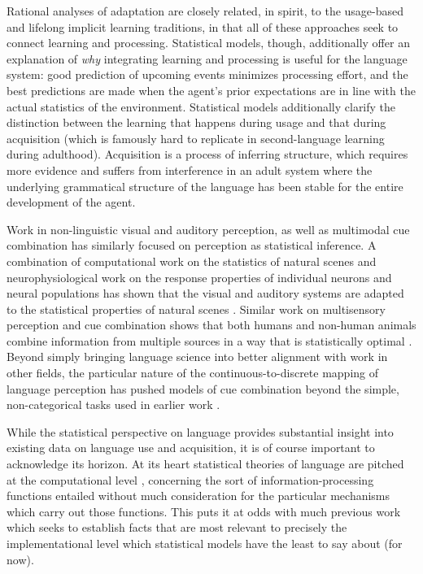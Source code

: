 \documentclass[11pt]{article}
\begin{document}
Rational analyses of adaptation are closely related, in spirit, to the usage-based and lifelong implicit learning traditions, in that all of these approaches seek to connect learning and processing.  Statistical models, though, additionally offer an explanation of \emph{why} integrating learning and processing is useful for the language system: good prediction of upcoming events minimizes processing effort, and the best predictions are made when the agent's prior expectations are in line with the actual statistics of the environment.  Statistical models additionally clarify the distinction between the learning that happens during usage and that during acquisition (which is famously hard to replicate in second-language learning during adulthood).  Acquisition is a process of inferring structure, which requires more evidence and suffers from interference in an adult system where the underlying grammatical structure of the language has been stable for the entire development of the agent.

Work in non-linguistic visual and auditory perception, as well as multimodal cue combination has similarly focused on perception as statistical inference.  A combination of computational work on the statistics of natural scenes and neurophysiological work on the response properties of individual neurons and neural populations has shown that the visual and auditory systems are adapted to the statistical properties of natural scenes \cite{Olshausen1996,Lewicki2002,Rodriguez2010}.  Similar work on multisensory perception and cue combination shows that both humans and non-human animals combine information from multiple sources in a way that is statistically optimal \cite{Alais2004,Ernst2002,Morgan2008}.  Beyond simply bringing language science into better alignment with work in other fields, the particular nature of the continuous-to-discrete mapping of language perception has pushed models of cue combination beyond the simple, non-categorical tasks used in earlier work \cite{Bejjanki2011,Toscano2010}.

While the statistical perspective on language provides substantial insight into existing data on language use and acquisition, it is of course important to acknowledge its horizon.  At its heart statistical theories of language are pitched at the computational level \cite{Marr1982}, concerning the sort of information-processing functions entailed without much consideration for the particular mechanisms which carry out those functions.  This puts it at odds with much previous work which seeks to establish facts that are most relevant to precisely the implementational level which statistical models have the least to say about (for now).
\end{document}
